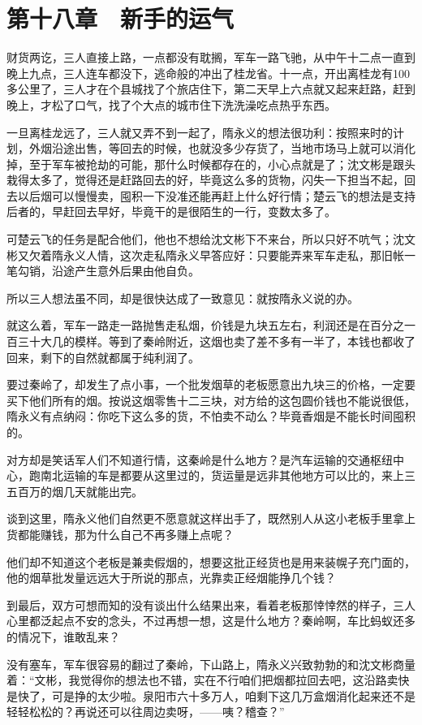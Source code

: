 \section{第十八章　新手的运气}

财货两讫，三人直接上路，一点都没有耽搁，军车一路飞驰，从中午十二点一直到晚上九点，三人连车都没下，逃命般的冲出了桂龙省。十一点，开出离桂龙有100多公里了，三人才在个县城找了个旅店住下，第二天早上六点就又起来赶路，赶到晚上，才松了口气，找了个大点的城市住下洗洗澡吃点热乎东西。

一旦离桂龙远了，三人就又弄不到一起了，隋永义的想法很功利：按照来时的计划，外烟沿途出售，等回去的时候，也就没多少存货了，当地市场马上就可以消化掉，至于军车被抢劫的可能，那什么时候都存在的，小心点就是了；沈文彬是跟头栽得太多了，觉得还是赶路回去的好，毕竟这么多的货物，闪失一下担当不起，回去以后烟可以慢慢卖，囤积一下没准还能再赶上什么好行情；楚云飞的想法是支持后者的，早赶回去早好，毕竟干的是很陌生的一行，变数太多了。

可楚云飞的任务是配合他们，他也不想给沈文彬下不来台，所以只好不吭气；沈文彬又欠着隋永义人情，这次走私隋永义早答应好：只要能弄来军车走私，那旧帐一笔勾销，沿途产生意外后果由他自负。

所以三人想法虽不同，却是很快达成了一致意见：就按隋永义说的办。

就这么着，军车一路走一路抛售走私烟，价钱是九块五左右，利润还是在百分之一百三十大几的模样。等到了秦岭附近，这烟也卖了差不多有一半了，本钱也都收了回来，剩下的自然就都属于纯利润了。

要过秦岭了，却发生了点小事，一个批发烟草的老板愿意出九块三的价格，一定要买下他们所有的烟。按说这烟零售十二三块，对方给的这包圆价钱也不能说很低，隋永义有点纳闷：你吃下这么多的货，不怕卖不动么？毕竟香烟是不能长时间囤积的。

对方却是笑话军人们不知道行情，这秦岭是什么地方？是汽车运输的交通枢纽中心，跑南北运输的车是都要从这里过的，货运量是远非其他地方可以比的，来上三五百万的烟几天就能出完。

谈到这里，隋永义他们自然更不愿意就这样出手了，既然别人从这小老板手里拿上货都能赚钱，那为什么自己不再多赚上点呢？

他们却不知道这个老板是兼卖假烟的，想要这批正经货也是用来装幌子充门面的，他的烟草批发量远远大于所说的那点，光靠卖正经烟能挣几个钱？

到最后，双方可想而知的没有谈出什么结果出来，看着老板那悻悻然的样子，三人心里都泛起点不安的念头，不过再想一想，这是什么地方？秦岭啊，车比蚂蚁还多的情况下，谁敢乱来？

没有塞车，军车很容易的翻过了秦岭，下山路上，隋永义兴致勃勃的和沈文彬商量着：“文彬，我觉得你的想法也不错，实在不行咱们把烟都拉回去吧，这沿路卖快是快了，可是挣的太少啦。泉阳市六十多万人，咱剩下这几万盒烟消化起来还不是轻轻松松的？再说还可以往周边卖呀，——咦？稽查？”

